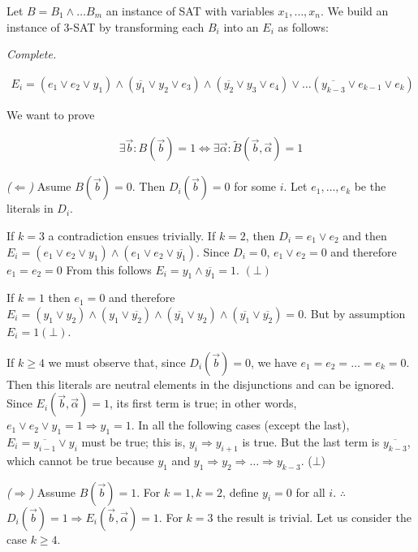 \documentclass[a4paper, 12pt]{article}
\begin{document}
Let $B = B_1 \land  \ldots B_m$ an instance of SAT with variables 
$x_1, \ldots, x_n$. We build an instance of $3$-SAT 
by transforming each $B_i$ into an $E_i$ as follows:

\textit{Complete.}

\begin{align*}
E_i = (e_1 \lor  e_2 \lor y_1) \land  (\overline{y_1} \lor  y_2 \lor  e_3) \land  (\overline{y_2} \lor  y_3 \lor  e_4) \lor \ldots (\overline{y_{k-3}} \lor e_{k-1} \lor e_{k})
\end{align*}

We want to prove

\begin{align*}
    \exists \overrightarrow{b} : B(\overrightarrow{b}) = 1 \iff \exists \overrightarrow{\alpha} : \tilde{ B }(\overrightarrow{b}, \overrightarrow{\alpha}) = 1
\end{align*}

\textit{($\Leftarrow$)} Asume $B(\overrightarrow{b}) = 0$. Then
$D_i(\overrightarrow{b}) = 0$ for some $i$. Let 
 $e_1, \ldots, e_k$ be the literals in $D_i$.

If $k = 3$ a contradiction ensues trivially. If $k = 2$, then $D_i = e_1 \lor
e_2$ and then $E_i = (e_1 \lor  e_2 \lor y_1) \land  (e_1 \lor  e_2 \lor
\overline{y_1})$. Since $D_i = 0$, $e_1 \lor  e_2 = 0$ and therefore $e_1 = e_2
= 0$ From this follows  $E_i = y_1 \land \overline{y_1} = 1$. $(\bot)$

If $k = 1$ then $e_1 = 0$ and therefore $E_i = (y_1 \lor  y_2) \land  (y_1 \lor
\overline{y_2}) \land  (\overline{y_1} \lor  y_2) \land  (\overline{y_1} \lor
\overline{y_2}) = 0$. But by assumption $E_i = 1 (\bot)$.

If $k\geq 4$ we must observe that, since $D_i(\overrightarrow{b}) =
0$, we have $e_1 = e_2 = \ldots = e_k = 0$. Then this literals 
are neutral elements in the disjunctions and can be ignored.
Since $E_i(\overrightarrow{b}, \overrightarrow{\alpha}) = 1$, its first term 
is true; in other words, $e_1 \lor  e_2 \lor  y_1 = 1
\Rightarrow y_1 = 1$. In all the following cases (except the last),
$E_i = \overline{y_{i-1}} \lor  y_i$ must be true; this is,
$y_i \Rightarrow y_{i+1}$ is true. But the last term is $\overline{y_{k-3}}$,
which cannot be true because $y_1$ and $ y_1 \Rightarrow y_2 \Rightarrow \ldots
\Rightarrow y_{k-3}$. ($\bot$)

\textit{($\Rightarrow$)} Assume $B(\overrightarrow{b}) = 1$. For $k = 1, k = 2$, define 
$y_i = 0$ for all $i$. $\therefore $ $D_i(\overrightarrow{b}) = 1 \Rightarrow
E_i(\overrightarrow{b}, \overrightarrow{\alpha}) = 1$. For $k = 3$ the result 
is trivial. Let us consider the case $k \geq 4$.
\end{document}
